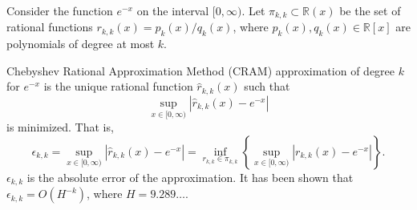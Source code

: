 Consider the function $e^{-x}$ on the interval $[0,\infty)$. Let
$\pi_{k,k}\subset \mathbb{R}(x)$ be the set of rational functions $r_{k,k}(x)
= p_k(x)/q_k(x)$, where $p_k(x), q_k(x)\in \mathbb{R}[x]$ are polynomials of
degree at most $k$.

Chebyshev Rational Approximation Method (CRAM) approximation of degree $k$
for $e^{-x}$ is the unique rational function $\hat{r}_{k,k}(x)$ such that
\begin{equation}
  \sup_{x\in[0, \infty)}|\hat{r}_{k, k}(x) - e^{-x}|
\end{equation}
is minimized. That is,
\begin{equation}
  \epsilon_{k,k} = \sup_{x\in[0, \infty)}|\hat{r}_{k, k}(x) - e^{-x}| = \inf_{r_{k,k}\in\pi_{k,k}}\left\{\sup_{x\in[0, \infty)}|r_{k, k}(x) - e^{-x}|\right\}.
\end{equation}
$\epsilon_{k,k}$ is the absolute error of the approximation. It has been shown
that $\epsilon_{k,k} = O(H^{-k})$, where $H=9.289\ldots$.
